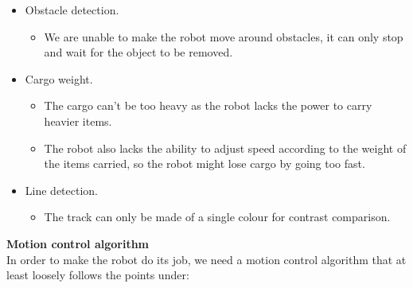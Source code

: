\documentclass[11pt]{article}
\begin{document}
\begin{itemize}
	\item Obstacle detection. \begin{itemize}
        \item We are unable to make the robot move around obstacles, it can only stop and wait for the object to be removed.
    \end{itemize}
	\item Cargo weight. \begin{itemize}
        \item The cargo can’t be too heavy as the robot lacks the power to carry heavier items.
        \item The robot also lacks the ability to adjust speed according to the weight of the items carried, so the robot might lose cargo by going too fast.
    \end{itemize}
	\item Line detection. \begin{itemize}
        \item The track can only be made of a single colour for contrast comparison.
    \end{itemize}
\end{itemize}
\textbf{Motion control algorithm}
\\
In order to make the robot do its job, we need a motion control algorithm that at least loosely follows the points under:
\end{document}
